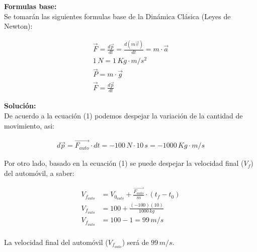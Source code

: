 \documentclass[11pt,letterpaper]{article}
\begin{document}
\textbf{Formulas base:}\\

Se tomarán las siguientes formulas base de la Dinámica Clásica (Leyes de Newton):

\begin{align}
\boxed{ \vec{F} = \frac{d\vec{p}}{dt} = \frac{d (m \vec{v})}{dt} = m \cdot \vec{a} }\\
\boxed{ 1\,N = 1\,Kg \cdot m/s^2}\\
\boxed{ \vec{P} = m \cdot \vec{g} }\\
\boxed{ \vec{F} = \frac{d\vec{p}}{dt} }
\end{align}

\textbf{Solución:}\\

De acuerdo a la ecuación (1) podemos despejar la variación de la cantidad de movimiento, asi:

\begin{align}
d\vec{p} = \vec{F_{auto}} \cdot dt = -100\,N \cdot 10\,s = -1000\,Kg \cdot m/s
\end{align}

Por otro lado, basado en la ecuación (1) se puede despejar la velocidad final ($V_{f}$) del automóvil, a saber:

\begin{align*}
V_{f_{auto}} &= V_{0_{auto}} + \frac{\vec{F_{auto}}}{m} \cdot (t_{f} - t_{0})\\
V_{f_{auto}} &= 100 + \frac{(-100)(10)}{1000\,kg}\\
V_{f_{auto}} &= 100 -1 = 99\,m/s\\
\end{align*}

La velocidad final del automóvil ($V_{f_{auto}}$) será de $99\,m/s.$

\end{document}
